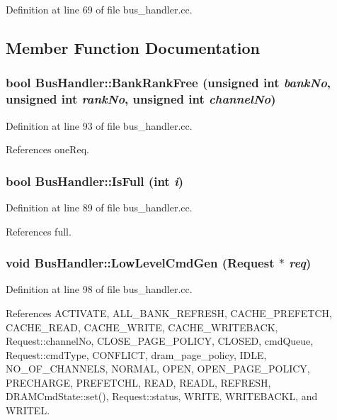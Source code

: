 Definition at line 69 of file bus\_\-handler.cc.

\subsection{Member Function Documentation}
\subsubsection[{BankRankFree}]{\setlength{\rightskip}{0pt plus 5cm}bool BusHandler::BankRankFree (unsigned int {\em bankNo}, \/  unsigned int {\em rankNo}, \/  unsigned int {\em channelNo})}\label{classBusHandler_08661b7c676ea61de65a76a615e2d8e0}




Definition at line 93 of file bus\_\-handler.cc.

References oneReq.
\subsubsection[{IsFull}]{\setlength{\rightskip}{0pt plus 5cm}bool BusHandler::IsFull (int {\em i})}\label{classBusHandler_c0ecf6b699545c251b6f75bbea68c2f2}




Definition at line 89 of file bus\_\-handler.cc.

References full.
\subsubsection[{LowLevelCmdGen}]{\setlength{\rightskip}{0pt plus 5cm}void BusHandler::LowLevelCmdGen ({\bf Request} $\ast$ {\em req})}\label{classBusHandler_2b8cd5f4be39270cf6abd4e6a64d45d0}




Definition at line 98 of file bus\_\-handler.cc.

References ACTIVATE, ALL\_\-BANK\_\-REFRESH, CACHE\_\-PREFETCH, CACHE\_\-READ, CACHE\_\-WRITE, CACHE\_\-WRITEBACK, Request::channelNo, CLOSE\_\-PAGE\_\-POLICY, CLOSED, cmdQueue, Request::cmdType, CONFLICT, dram\_\-page\_\-policy, IDLE, NO\_\-OF\_\-CHANNELS, NORMAL, OPEN, OPEN\_\-PAGE\_\-POLICY, PRECHARGE, PREFETCHL, READ, READL, REFRESH, DRAMCmdState::set(), Request::status, WRITE, WRITEBACKL, and WRITEL.

